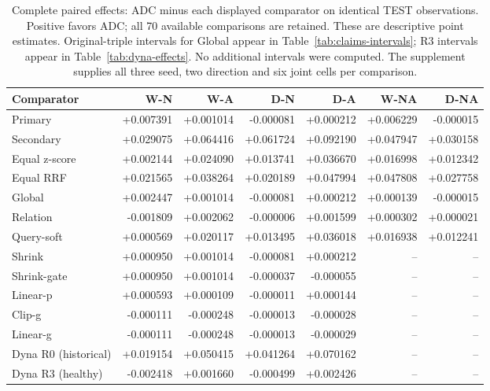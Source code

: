 \begin{table}[htbp]
\centering\footnotesize\setlength{\tabcolsep}{3pt}
\caption{Complete paired effects: ADC minus each displayed comparator on identical TEST observations. Positive favors ADC; all 70 available comparisons are retained. These are descriptive point estimates. Original-triple intervals for Global appear in Table~\ref{tab:claims-intervals}; R3 intervals appear in Table~\ref{tab:dyna-effects}. No additional intervals were computed. The supplement supplies all three seed, two direction and six joint cells per comparison.}
\label{tab:claims-paired}
\begin{tabular}{lrrrr|rr}
\toprule
Comparator & W-N & W-A & D-N & D-A & W-NA & D-NA\\
\midrule
Primary & +0.007391 & +0.001014 & -0.000081 & +0.000212 & +0.006229 & -0.000015\\
Secondary & +0.029075 & +0.064416 & +0.061724 & +0.092190 & +0.047947 & +0.030158\\
Equal z-score & +0.002144 & +0.024090 & +0.013741 & +0.036670 & +0.016998 & +0.012342\\
Equal RRF & +0.021565 & +0.038264 & +0.020189 & +0.047994 & +0.047808 & +0.027758\\
Global & +0.002447 & +0.001014 & -0.000081 & +0.000212 & +0.000139 & -0.000015\\
Relation & -0.001809 & +0.002062 & -0.000006 & +0.001599 & +0.000302 & +0.000021\\
Query-soft & +0.000569 & +0.020117 & +0.013495 & +0.036018 & +0.016938 & +0.012241\\
Shrink & +0.000950 & +0.001014 & -0.000081 & +0.000212 & -- & --\\
Shrink-gate & +0.000950 & +0.001014 & -0.000037 & -0.000055 & -- & --\\
Linear-p & +0.000593 & +0.000109 & -0.000011 & +0.000144 & -- & --\\
Clip-g & -0.000111 & -0.000248 & -0.000013 & -0.000028 & -- & --\\
Linear-g & -0.000111 & -0.000248 & -0.000013 & -0.000029 & -- & --\\
Dyna R0 (historical) & +0.019154 & +0.050415 & +0.041264 & +0.070162 & -- & --\\
Dyna R3 (healthy) & -0.002418 & +0.001660 & -0.000499 & +0.002426 & -- & --\\
\bottomrule
\end{tabular}
\end{table}
